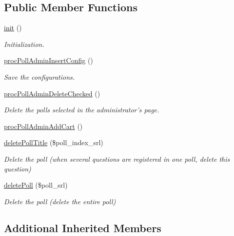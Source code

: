 \subsection*{Public Member Functions}
\begin{DoxyCompactItemize}
\item 
\hyperlink{classpollAdminController_adaf2c123a1f123bcb92de4f373ead8a9}{init} ()
\begin{DoxyCompactList}\small\item\em Initialization. \end{DoxyCompactList}\item 
\hyperlink{classpollAdminController_ab34f3cb8a5b40217ed0acdaaa11ee0ad}{proc\-Poll\-Admin\-Insert\-Config} ()
\begin{DoxyCompactList}\small\item\em Save the configurations. \end{DoxyCompactList}\item 
\hyperlink{classpollAdminController_af1a9c9f33253af68ac12e4c026bd699a}{proc\-Poll\-Admin\-Delete\-Checked} ()
\begin{DoxyCompactList}\small\item\em Delete the polls selected in the administrator's page. \end{DoxyCompactList}\item 
\hyperlink{classpollAdminController_a148e3ec22f5a872647e7208bb853d3a1}{proc\-Poll\-Admin\-Add\-Cart} ()
\item 
\hyperlink{classpollAdminController_acd355746ff4a145b974b2a95b9c0eda9}{delete\-Poll\-Title} (\$poll\-\_\-index\-\_\-srl)
\begin{DoxyCompactList}\small\item\em Delete the poll (when several questions are registered in one poll, delete this question) \end{DoxyCompactList}\item 
\hyperlink{classpollAdminController_ab8fa4ab256e902120f27dac1edea8f57}{delete\-Poll} (\$poll\-\_\-srl)
\begin{DoxyCompactList}\small\item\em Delete the poll (delete the entire poll) \end{DoxyCompactList}\end{DoxyCompactItemize}
\subsection*{Additional Inherited Members}


